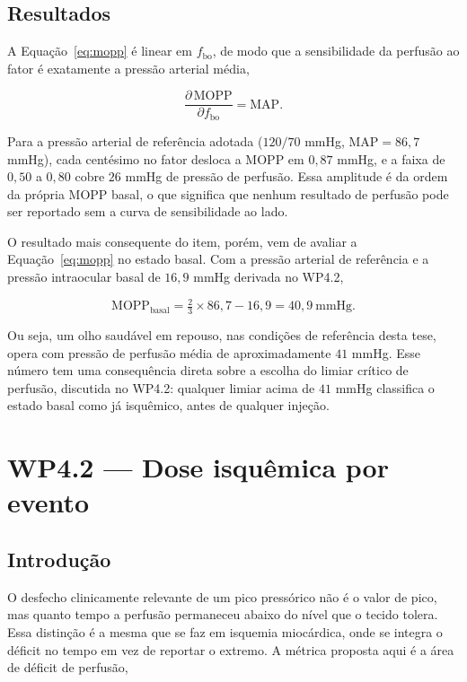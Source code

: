 \subsection{Resultados}

A Equação~\ref{eq:mopp} é linear em $f_{\mathrm{bo}}$, de modo que a sensibilidade da perfusão ao fator é exatamente a pressão arterial média,

\begin{equation}
\frac{\partial\,\mathrm{MOPP}}{\partial f_{\mathrm{bo}}}=\mathrm{MAP}.
\label{eq:dmopp_df}
\end{equation}

Para a pressão arterial de referência adotada ($120/70$ mmHg, $\mathrm{MAP}=86{,}7$ mmHg), cada centésimo no fator desloca a MOPP em $0{,}87$ mmHg, e a faixa de $0{,}50$ a $0{,}80$ cobre $26$ mmHg de pressão de perfusão. Essa amplitude é da ordem da própria MOPP basal, o que significa que nenhum resultado de perfusão pode ser reportado sem a curva de sensibilidade ao lado.

O resultado mais consequente do item, porém, vem de avaliar a Equação~\ref{eq:mopp} no estado basal. Com a pressão arterial de referência e a pressão intraocular basal de $16{,}9$ mmHg derivada no WP4.2,

\begin{equation}
\mathrm{MOPP}_{\mathrm{basal}}=\tfrac{2}{3}\times 86{,}7-16{,}9=40{,}9\ \text{mmHg}.
\label{eq:mopp_basal}
\end{equation}

Ou seja, um olho saudável em repouso, nas condições de referência desta tese, opera com pressão de perfusão média de aproximadamente $41$ mmHg. Esse número tem uma consequência direta sobre a escolha do limiar crítico de perfusão, discutida no WP4.2: qualquer limiar acima de $41$ mmHg classifica o estado basal como já isquêmico, antes de qualquer injeção.

\section{WP4.2 --- Dose isquêmica por evento}

\subsection{Introdução}

O desfecho clinicamente relevante de um pico pressórico não é o valor de pico, mas quanto tempo a perfusão permaneceu abaixo do nível que o tecido tolera. Essa distinção é a mesma que se faz em isquemia miocárdica, onde se integra o déficit no tempo em vez de reportar o extremo. A métrica proposta aqui é a área de déficit de perfusão,

